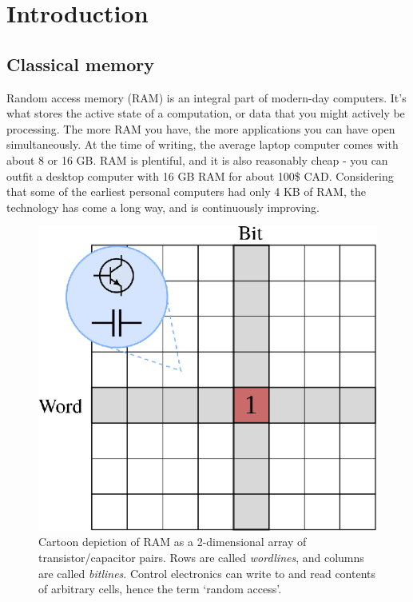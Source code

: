 \documentclass[a4paper,12pt]{article}
\begin{document}

\section{Introduction}

\subsection{Classical memory}

Random access memory (RAM) is an integral part of modern-day computers.
It's what stores the active state of a computation, or data that you might actively be processing. 
The more RAM you have, the more applications you can have open simultaneously.
At the time of writing, the average laptop computer comes with about 8 or 16 GB. 
RAM is plentiful, and it is also reasonably cheap - you can outfit a desktop computer with 16 GB RAM for about 100\$ CAD. 
Considering that some of the earliest personal computers had only 4 KB of RAM, the technology has come a long way, and is continuously improving.

\begin{figure}[ht]
 \centering
  \captionsetup{width=.89\linewidth}
 \includegraphics[scale=0.8]{images/memory-models}
 \caption{Cartoon depiction of RAM as a 2-dimensional array of transistor/capacitor pairs.
 Rows are called \emph{wordlines}, and columns are called \emph{bitlines}.
 Control electronics can write to and read contents of arbitrary cells, hence the term `random access'.}
 \label{fig:memory-models}
\end{figure}
\end{document}
